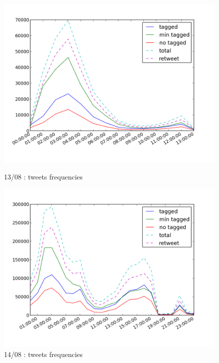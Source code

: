 \documentclass[a4paper,12pt]{report}
\begin{document}
\begin{figure}[H]
\begin{minipage}[t]{0.48\textwidth}
\begin{center}
	\includegraphics[width=\textwidth]{images/freqs/freq_12_08.png}
	\caption{13/08 : tweets frequencies}
\end{center}
\end{minipage}
\hfill
\begin{minipage}[t]{0.48\textwidth}
\begin{center}
	\includegraphics[width=\textwidth]{images/freqs/freq_14_08.png}
	\caption{14/08 : tweets frequencies}
\end{center}
\end{minipage}
\end{figure}
\end{document}
